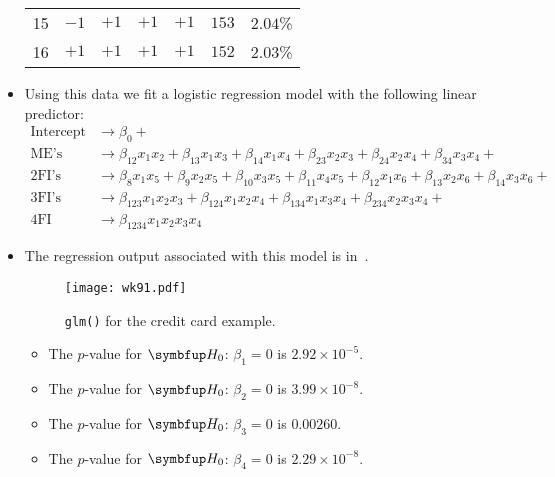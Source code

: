 \begin{itemize}
\begin{table}[!htbp]
\begin{tabular}{ccccccc}
                        15        & $-1$     & $+1$     & $+1$     & $+1$     & $153$    & $2.04$\%        \\
                        16        & $+1$     & $+1$     & $+1$     & $+1$     & $152$    & $2.03$\%        \\
                        \bottomrule
                  \end{tabular}
            \end{table}
      \item Using this data we fit a logistic regression model with the following linear predictor:
            \begin{align*}
                  \text{Intercept} & \to\beta_{0}+                                                                                                          \\
                  \text{ME's}      & \to\beta_{12}x_1x_2+\beta_{13}x_1x_3+\beta_{14}x_1x_4+\beta_{23}x_2x_3+\beta_{24}x_2x_4+\beta_{34}x_3x_4+              \\
                  \text{2FI's}     & \to\beta_{8}x_1x_5+\beta_9x_2x_5+\beta_{10}x_3x_5+\beta_{11}x_4x_5+\beta_{12}x_1x_6+\beta_{13}x_2x_6+\beta_{14}x_3x_6+ \\
                  \text{3FI's}     & \to\beta_{123}x_1x_2x_3+\beta_{124}x_1x_2x_4+\beta_{134}x_1x_3x_4+\beta_{234}x_2x_3x_4+                                \\
                  \text{4FI}       & \to\beta_{1234}x_1x_2x_3x_4
            \end{align*}
      \item The regression output associated with this model is in~.
            \begin{figure}[!htbp]
                  \centering
                  \texttt{[image: wk91.pdf]}
                  \caption{\texttt{glm()} for the credit card example.}\label{fig:creditcardglm}
            \end{figure}
            \begin{itemize}
                  \item The $ p $-value for $ \HN $: $ \beta_1=0 $ is $ 2.92\times 10^{-5} $.
                  \item The $ p $-value for $ \HN $: $ \beta_2=0 $ is $ 3.99\times 10^{-8} $.
                  \item The $ p $-value for $ \HN $: $ \beta_3=0 $ is $ 0.00260 $.
                  \item The $ p $-value for $ \HN $: $ \beta_4=0 $ is $ 2.29\times 10^{-8} $.

\end{itemize}
\end{itemize}
